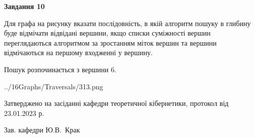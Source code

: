 \documentclass[12pt, ukrainian]{article}
\begin{document}
{\begin {large}
{\begin {center}\textbf{Завдання 10}\end {center}}\par
Для графа на рисунку вказати послідовність, в якій алгоритм пошуку в глибину буде відмічати відвідані вершини, якщо списки суміжності вершин переглядаються алгоритмом за зростанням міток вершин та вершини відмічаються на першому вход\-женні у вершину.\par
Пошук розпочинається з вершини 6.\par

\begin{center}
	{../16Graphs/Traversals/313.png}
\end{center}\par
\newpage


\end {large}
}
{\smallskip \begin {small} Затверджено на засіданні кафедри теоретичної кібернетики, протокол  від   23.01.2023 р.\par\smallskip\smallskip
{\parbox {6.5 cm}{Зав. кафедри \dotfill Ю.В.~Крак}} \end{small}}
\end{document}
